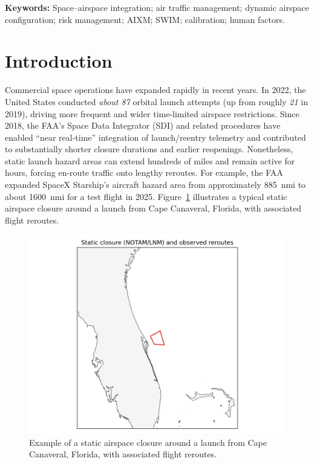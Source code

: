 \documentclass[journal]{new-aiaa}
\newcommand{\AIXM}{\textsc{AIXM}}
\newcommand{\SWIM}{\textsc{SWIM}}
\begin{document}
\textbf{Keywords:} Space–airspace integration; air traffic management; dynamic airspace configuration; risk management; \AIXM; \SWIM; calibration; human factors.

\section{Introduction}
Commercial space operations have expanded rapidly in recent years. In 2022, the United States conducted \emph{about 87} orbital launch attempts (up from roughly \emph{21} in 2019), driving more frequent and wider time-limited airspace restrictions.\cite{McDowell2022,Launch2019Gunter} Since 2018, the FAA’s Space Data Integrator (SDI) and related procedures have enabled “near real-time” integration of launch/reentry telemetry and contributed to substantially shorter closure durations and earlier reopenings.\cite{FAA_SDI_2024,OIG2023}
Nonetheless, static launch hazard areas can extend hundreds of miles and remain active for hours, forcing en-route traffic onto lengthy reroutes.\cite{CRS2019,FAA2023} For example, the FAA expanded SpaceX Starship’s aircraft hazard area from approximately 885~nmi to about 1600~nmi for a test flight in 2025.\cite{Reuters_StarshipAHA,FedReg_StarshipF9} Figure~\ref{fig:static_closure} illustrates a typical static airspace closure around a launch from Cape Canaveral, Florida, with associated flight reroutes.

\begin{figure}[t]
  \centering
  \includegraphics[width=0.85\linewidth]{closure_example.png}
  \caption{Example of a static airspace closure around a launch from Cape Canaveral, Florida, with associated flight reroutes.}
  \label{fig:static_closure}
\end{figure}
\end{document}
